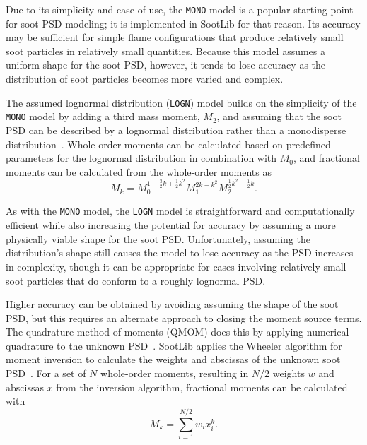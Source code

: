 \documentclass[preprint,letterpaper]{elsarticle}
\begin{document}
Due to its simplicity and ease of use, the \texttt{MONO} model is a popular starting point for soot PSD modeling; it is implemented in SootLib for that reason. Its accuracy may be sufficient for simple flame configurations that produce relatively small soot particles in relatively small quantities. Because this model assumes a uniform shape for the soot PSD, however, it tends to lose accuracy as the distribution of soot particles becomes more varied and complex.


The assumed lognormal distribution (\texttt{LOGN}) model builds on the simplicity of the \texttt{MONO} model by adding a third mass moment, $M_2$, and assuming that the soot PSD can be described by a lognormal distribution rather than a monodisperse distribution~\cite{Lignell_2008b}. Whole-order moments can be calculated based on predefined parameters for the lognormal distribution in combination with $M_0$, and fractional moments can be calculated from the whole-order moments as
\begin{equation}
    M_k = M_0^{1-\frac{3}{2}k+\frac{1}{2}k^2} M_1^{2k-k^2} M_2^{\frac{1}{2}k^2-\frac{1}{2}k}.
\end{equation}

As with the \texttt{MONO} model, the \texttt{LOGN} model is straightforward and computationally efficient while also increasing the potential for accuracy by assuming a more physically viable shape for the soot PSD. Unfortunately, assuming the distribution's shape still causes the model to lose accuracy as the PSD increases in complexity, though it can be appropriate for cases involving relatively small soot particles that do conform to a roughly lognormal PSD.


Higher accuracy can be obtained by avoiding assuming the shape of the soot PSD, but this requires an alternate approach to closing the moment source terms. The quadrature method of moments (QMOM) does this by applying numerical quadrature to the unknown PSD~\cite{McGraw_1997}. SootLib applies the Wheeler algorithm for moment inversion to calculate the weights and abscissas of the unknown soot PSD~\cite{Marchisio_2013,Wheeler_1974}. For a set of $N$ whole-order moments, resulting in $N/2$ weights $w$ and abscissas $x$ from the inversion algorithm, fractional moments can be calculated with
\begin{equation}
    M_k = \sum_{i=1}^{N/2} w_i x_i^k.
\end{equation}
\end{document}

